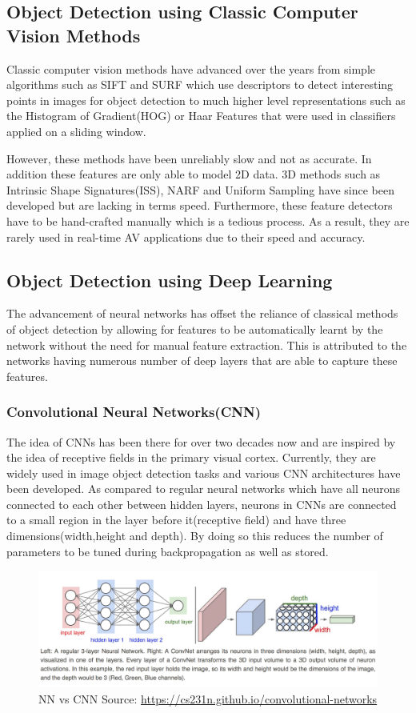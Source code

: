 \subsection{Object Detection using Classic Computer Vision Methods}
Classic computer vision methods have advanced over the years from simple algorithms such as SIFT\cite{lowe1999object} and SURF\cite{bay2006surf} which use descriptors to detect interesting points in images for object detection to much higher level representations such as the Histogram of Gradient(HOG)\cite{dalal2005histograms} or Haar Features\cite{viola2001rapid}  that were used in classifiers applied on a sliding window. 


However, these methods have been unreliably slow and not as accurate. In addition these features are only able to model 2D data. 3D methods such as Intrinsic Shape Signatures(ISS)\cite{zhong2009intrinsic}, NARF\cite{steder2010narf} and Uniform Sampling have since been developed but are lacking in terms speed. Furthermore, these feature detectors have to be hand-crafted manually which is a tedious process. As a result, they are rarely used in real-time AV applications due to their speed and accuracy.


\subsection{Object Detection using Deep Learning}
The advancement of neural networks has offset the reliance of classical methods of object detection by allowing for features to be automatically learnt by the network without the need for manual feature extraction. This is attributed to the networks having numerous number of deep layers that are able to capture these features.  
\subsubsection*{Convolutional Neural Networks(CNN)}
The idea of CNNs has been there for over two decades now and are inspired by the idea of receptive fields in the primary visual cortex. Currently, they are widely used in image object detection tasks and various CNN architectures have been developed. As compared to regular neural networks which have all neurons connected to each other between hidden layers, neurons in CNNs are connected to a small region in the layer before it(receptive field) and have three dimensions(width,height and depth). By doing so this reduces the number of parameters to be tuned during backpropagation as well as stored. 
\begin{figure}[h]
	\centering 
	\includegraphics[width=\linewidth]{images/neuralnet}
	\caption{NN vs CNN Source: \url{https://cs231n.github.io/convolutional-networks}}
	\label{fig:cnn}
\end{figure}


